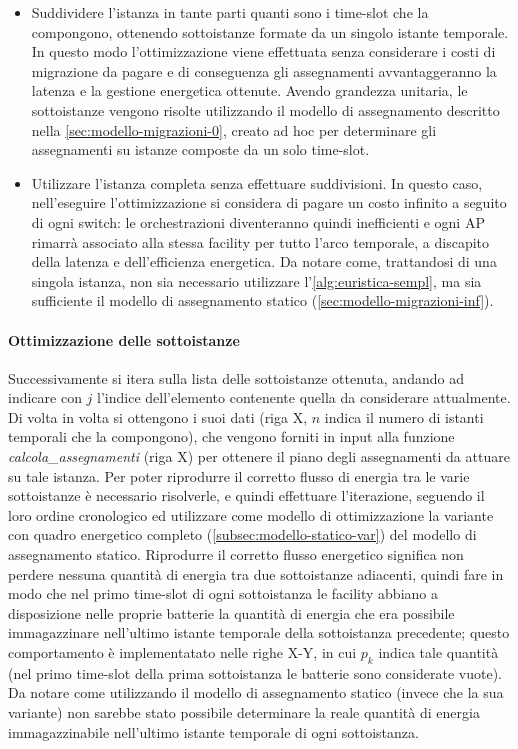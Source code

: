 \begin{itemize}
    \item Suddividere l'istanza in tante parti quanti sono i time-slot che la compongono, ottenendo sottoistanze formate da un singolo istante temporale. In questo modo l'ottimizzazione viene effettuata senza considerare i costi di migrazione da pagare e di conseguenza gli assegnamenti avvantaggeranno la latenza e la gestione energetica ottenute. Avendo grandezza unitaria, le sottoistanze vengono risolte utilizzando il modello di assegnamento descritto nella \autoref{sec:modello-migrazioni-0}, creato ad hoc per determinare gli assegnamenti su istanze composte da un solo time-slot.

    \item Utilizzare l'istanza completa senza effettuare suddivisioni. In questo caso, nell'eseguire l'ottimizzazione si considera di pagare un costo infinito a seguito di ogni switch: le orchestrazioni diventeranno quindi inefficienti e ogni AP rimarrà associato alla stessa facility per tutto l'arco temporale, a discapito della latenza e dell'efficienza energetica. Da notare come, trattandosi di una singola istanza, non sia necessario utilizzare l'\autoref{alg:euristica-sempl}, ma sia sufficiente il modello di assegnamento statico (\autoref{sec:modello-migrazioni-inf}).
    \end{itemize}

\paragraph{Ottimizzazione delle sottoistanze}

Successivamente si itera sulla lista delle sottoistanze ottenuta, andando ad indicare con $j$ l'indice dell'elemento contenente quella da considerare attualmente. Di volta in volta si ottengono i suoi dati (riga X, $n$ indica il numero di istanti temporali che la compongono), che vengono forniti in input alla funzione \textit{calcola\_assegnamenti} (riga X) per ottenere il piano degli assegnamenti da attuare su tale istanza. Per poter riprodurre il corretto flusso di energia tra le varie sottoistanze è necessario risolverle, e quindi effettuare l'iterazione, seguendo il loro ordine cronologico ed utilizzare come modello di ottimizzazione la variante con quadro energetico completo (\autoref{subsec:modello-statico-var}) del modello di assegnamento statico. Riprodurre il corretto flusso energetico significa non perdere nessuna quantità di energia tra due sottoistanze adiacenti, quindi fare in modo che nel primo time-slot di ogni sottoistanza le facility abbiano a disposizione nelle proprie batterie la quantità di energia che era possibile immagazzinare nell'ultimo istante temporale della sottoistanza precedente; questo comportamento è implementatato nelle righe X-Y, in cui $p_k$ indica tale quantità (nel primo time-slot della prima sottoistanza le batterie sono considerate vuote). Da notare come utilizzando il modello di assegnamento statico (invece che la sua variante) non sarebbe stato possibile determinare la reale quantità di energia immagazzinabile nell'ultimo istante temporale di ogni sottoistanza.

